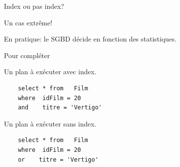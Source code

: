\begin{frame}[fragile]{Index ou pas index?}

Un cas extrême!

\medskip


\medskip

En pratique: le SGBD décide en fonction des statistiques.

\end{frame}


\begin{frame}[fragile]{Pour compléter}

Un plan à exécuter avec index.

\begin{verbatim}
    select * from   Film
    where  idFilm = 20 
    and    titre = 'Vertigo'
\end{verbatim}

\vfill

Un plan à exécuter sans index.

\begin{verbatim}
    select * from   Film
    where  idFilm = 20 
    or    titre = 'Vertigo'
\end{verbatim}

\end{frame}
